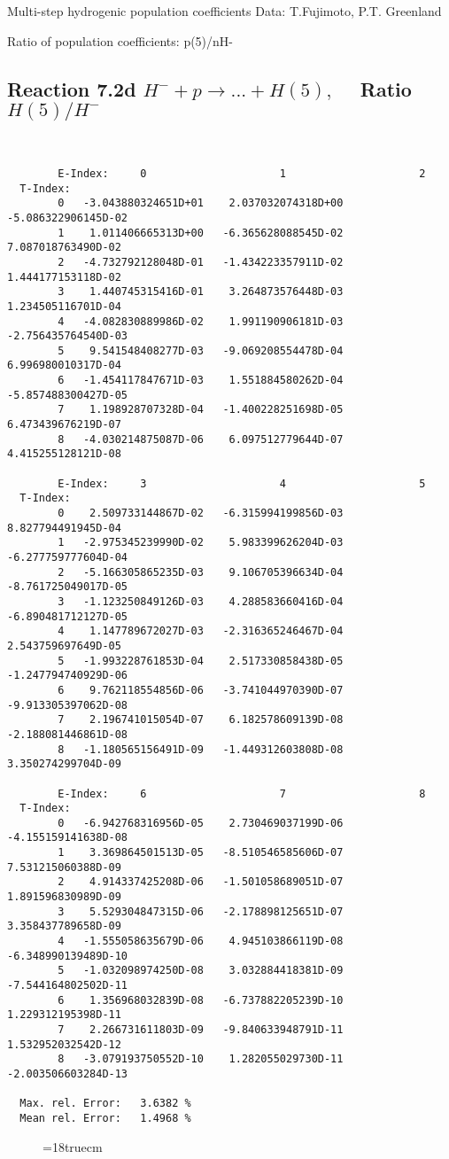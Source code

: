  Multi-step hydrogenic population coefficients
 Data: T.Fujimoto, P.T. Greenland

 Ratio of population coefficients: p(5)/nH-

\subsection{
Reaction 7.2d $ H^- + p \rightarrow ...+ H(5) , \quad $
Ratio $H(5)/H^- $
}

\begin{verbatim}


        E-Index:     0                     1                     2
  T-Index:
        0   -3.043880324651D+01    2.037032074318D+00   -5.086322906145D-02
        1    1.011406665313D+00   -6.365628088545D-02    7.087018763490D-02
        2   -4.732792128048D-01   -1.434223357911D-02    1.444177153118D-02
        3    1.440745315416D-01    3.264873576448D-03    1.234505116701D-04
        4   -4.082830889986D-02    1.991190906181D-03   -2.756435764540D-03
        5    9.541548408277D-03   -9.069208554478D-04    6.996980010317D-04
        6   -1.454117847671D-03    1.551884580262D-04   -5.857488300427D-05
        7    1.198928707328D-04   -1.400228251698D-05    6.473439676219D-07
        8   -4.030214875087D-06    6.097512779644D-07    4.415255128121D-08

        E-Index:     3                     4                     5
  T-Index:
        0    2.509733144867D-02   -6.315994199856D-03    8.827794491945D-04
        1   -2.975345239990D-02    5.983399626204D-03   -6.277759777604D-04
        2   -5.166305865235D-03    9.106705396634D-04   -8.761725049017D-05
        3   -1.123250849126D-03    4.288583660416D-04   -6.890481712127D-05
        4    1.147789672027D-03   -2.316365246467D-04    2.543759697649D-05
        5   -1.993228761853D-04    2.517330858438D-05   -1.247794740929D-06
        6    9.762118554856D-06   -3.741044970390D-07   -9.913305397062D-08
        7    2.196741015054D-07    6.182578609139D-08   -2.188081446861D-08
        8   -1.180565156491D-09   -1.449312603808D-08    3.350274299704D-09

        E-Index:     6                     7                     8
  T-Index:
        0   -6.942768316956D-05    2.730469037199D-06   -4.155159141638D-08
        1    3.369864501513D-05   -8.510546585606D-07    7.531215060388D-09
        2    4.914337425208D-06   -1.501058689051D-07    1.891596830989D-09
        3    5.529304847315D-06   -2.178898125651D-07    3.358437789658D-09
        4   -1.555058635679D-06    4.945103866119D-08   -6.348990139489D-10
        5   -1.032098974250D-08    3.032884418381D-09   -7.544164802502D-11
        6    1.356968032839D-08   -6.737882205239D-10    1.229312195398D-11
        7    2.266731611803D-09   -9.840633948791D-11    1.532952032542D-12
        8   -3.079193750552D-10    1.282055029730D-11   -2.003506603284D-13

  Max. rel. Error:   3.6382 %
  Mean rel. Error:   1.4968 %

\end{verbatim}
\begin{figure} \label{7.2d}
\epsfxsize=18truecm
\end{figure}
\newpage

